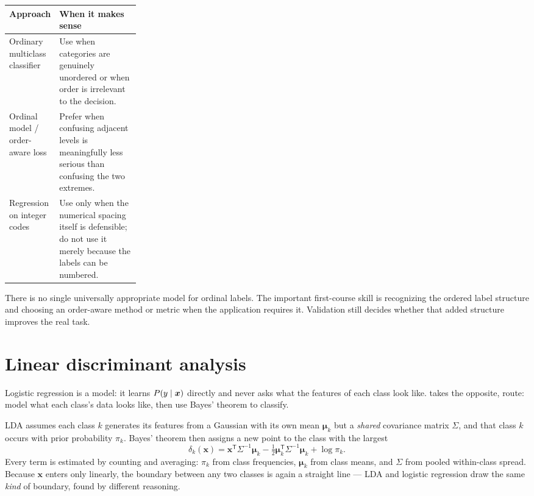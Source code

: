 \begin{mltable}
\begin{tabularx}{\linewidth}{@{}p{0.25\linewidth}X@{}}
\toprule
\rowcolor{MLPaleBlue!92}
Approach & When it makes sense \\
\midrule
Ordinary multiclass classifier & Use when categories are genuinely unordered or when order is irrelevant to the decision. \\
Ordinal model / order-aware loss & Prefer when confusing adjacent levels is meaningfully less serious than confusing the two extremes. \\
Regression on integer codes & Use only when the numerical spacing itself is defensible; do not use it merely because the labels can be numbered. \\
\bottomrule
\end{tabularx}
\end{mltable}

There is no single universally appropriate model for ordinal labels. The important first-course skill is recognizing the ordered label structure and choosing an order-aware method or metric when the application requires it. Validation still decides whether that added structure improves the real task.

\section{Linear discriminant analysis}

Logistic regression is a  model: it learns $P(y\mathrel{|}\bm{x})$ directly and never asks what the features of each class look like.  takes the opposite,  route: model what each class's data looks like, then use Bayes' theorem to classify.

LDA assumes each class $k$ generates its features from a Gaussian with its own mean $\bm{\mu}_k$ but a \emph{shared} covariance matrix $\Sigma$, and that class $k$ occurs with prior probability $\pi_k$. Bayes' theorem then assigns a new point to the class with the largest 
\[
  \delta_k(\bm{x})
  =\bm{x}^{\mathsf T}\Sigma^{-1}\bm{\mu}_k
  -\tfrac{1}{2}\bm{\mu}_k^{\mathsf T}\Sigma^{-1}\bm{\mu}_k
  +\log\pi_k.
\]
Every term is estimated by counting and averaging: $\pi_k$ from class frequencies, $\bm{\mu}_k$ from class means, and $\Sigma$ from pooled within-class spread. Because $\bm{x}$ enters only linearly, the boundary between any two classes is again a straight line --- LDA and logistic regression draw the same \emph{kind} of boundary, found by different reasoning.

